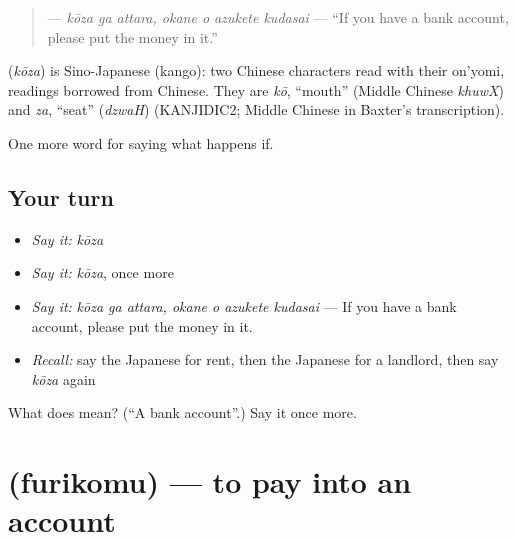 \begin{quote}
\textbf{   } — \emph{kōza ga attara, okane o azukete kudasai} — \textquotedblleft{}If you have a bank account, please put the money in it.\textquotedblright{}
\end{quote}

\begin{cousinweb}
\textbf{} (\emph{kōza}) is Sino-Japanese (kango): two Chinese characters read with their on'yomi, readings borrowed from Chinese. They are \emph{kō}, \textquotedblleft{}mouth\textquotedblright{} (Middle Chinese \emph{khuwX}) and \emph{za}, \textquotedblleft{}seat\textquotedblright{} (\emph{dzwaH}) (KANJIDIC2; Middle Chinese in Baxter's transcription).
\end{cousinweb}

\begin{grammarlens}[title={What you've built}]
One more word for saying what happens if.
\end{grammarlens}

\subsection*{Your turn}
\begin{itemize}
\raggedright
  \item \emph{Say it:} \emph{kōza}
  \item \emph{Say it:} \emph{kōza}, once more
  \item \emph{Say it:} \emph{kōza ga attara, okane o azukete kudasai} — If you have a bank account, please put the money in it.
  \item \emph{Recall:} say the Japanese for rent, then the Japanese for a landlord, then say \emph{kōza} again
\end{itemize}

\begin{tcolorbox}[breakable,colback=teal!4,colframe=teal!35!black,title={Before you move on}]
What does  mean? (\textquotedblleft{}A bank account\textquotedblright{}.) Say it once more.
\end{tcolorbox}
\section[\texorpdfstring{\ja{ふりこむ} (furikomu)}{ふりこむ (furikomu)}]{ (furikomu) — to pay into an account}

\label{lesson:JA-C358-furikomu}



